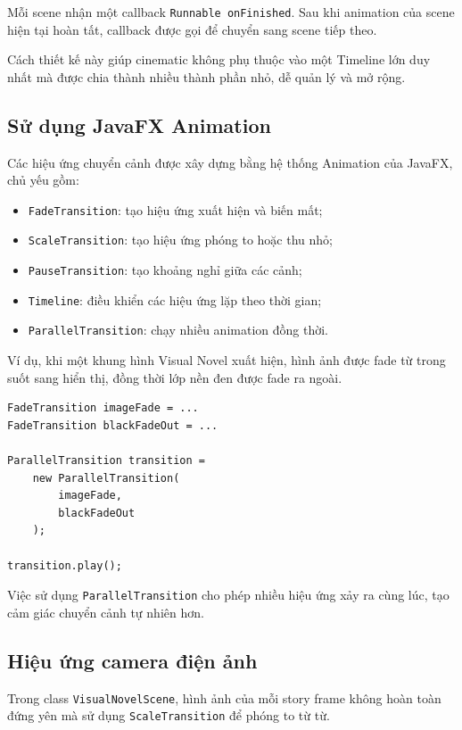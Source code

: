 \documentclass[12pt,a4paper]{report}
\begin{document}
    Mỗi scene nhận một callback \texttt{Runnable onFinished}.
    Sau khi animation của scene hiện tại hoàn tất, callback được gọi
    để chuyển sang scene tiếp theo.

    Cách thiết kế này giúp cinematic không phụ thuộc vào một Timeline
    lớn duy nhất mà được chia thành nhiều thành phần nhỏ, dễ quản lý
    và mở rộng.

    \subsection{Sử dụng JavaFX Animation}

    Các hiệu ứng chuyển cảnh được xây dựng bằng hệ thống Animation
    của JavaFX, chủ yếu gồm:

    \begin{itemize}
        \item \texttt{FadeTransition}: tạo hiệu ứng xuất hiện và biến mất;
        \item \texttt{ScaleTransition}: tạo hiệu ứng phóng to hoặc thu nhỏ;
        \item \texttt{PauseTransition}: tạo khoảng nghỉ giữa các cảnh;
        \item \texttt{Timeline}: điều khiển các hiệu ứng lặp theo thời gian;
        \item \texttt{ParallelTransition}: chạy nhiều animation đồng thời.
    \end{itemize}

    Ví dụ, khi một khung hình Visual Novel xuất hiện, hình ảnh được
    fade từ trong suốt sang hiển thị, đồng thời lớp nền đen được fade
    ra ngoài.

    \begin{verbatim}
FadeTransition imageFade = ...
FadeTransition blackFadeOut = ...

ParallelTransition transition =
    new ParallelTransition(
        imageFade,
        blackFadeOut
    );

transition.play();
    \end{verbatim}

    Việc sử dụng \texttt{ParallelTransition} cho phép nhiều hiệu ứng
    xảy ra cùng lúc, tạo cảm giác chuyển cảnh tự nhiên hơn.

    \subsection{Hiệu ứng camera điện ảnh}

    Trong class \texttt{VisualNovelScene}, hình ảnh của mỗi story frame
    không hoàn toàn đứng yên mà sử dụng \texttt{ScaleTransition} để
    phóng to từ từ.
\end{document}
